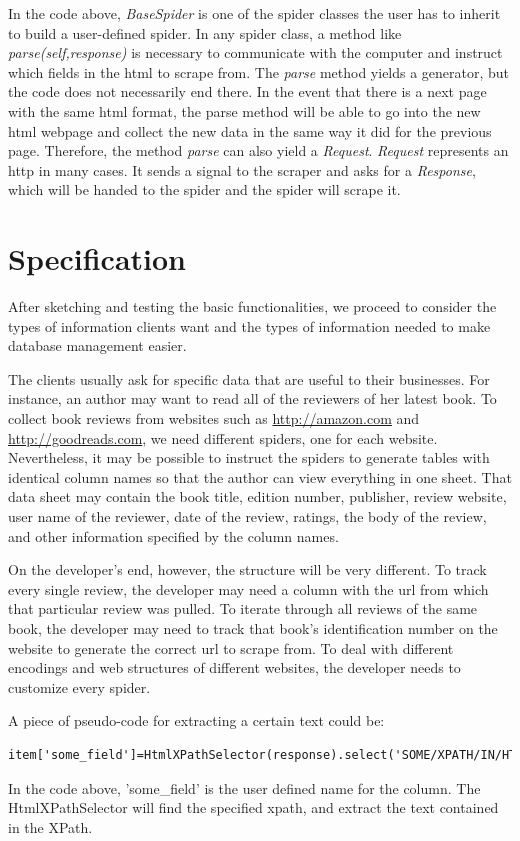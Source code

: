\documentclass[12pt,twoside,draft]{report}
\begin{document}
In the code above, \textit{BaseSpider} is one of the spider classes the user has to inherit to build a user-defined spider. In any spider class, a method like \textit{parse(self,response)} is necessary to communicate with the computer and instruct which fields in the html to scrape from. The \textit{parse} method yields a generator, but the code does not necessarily end there. In the event that there is a next page with the same html format, the parse method will be able to go into the new html webpage and collect the new data in the same way it did for the previous page. Therefore, the method \textit{parse} can also yield a \textit{Request}. \textit{Request} represents an \gls{http} in many cases. It sends a signal to the scraper and asks for a \textit{Response}, which will be handed to the spider and the spider will scrape it.

\section{Specification}

After sketching and testing the basic functionalities, we proceed to consider the types of information clients want and the types of information needed to make database management easier. 

The clients usually ask for specific data that are useful to their businesses. For instance, an author may want to read all of the reviewers of her latest book. To collect book reviews from websites such as \url{http://amazon.com} and \url{http://goodreads.com}, we need different spiders, one for each website. Nevertheless, it may be possible to instruct the spiders to generate tables with identical column names so that the author can view everything in one sheet. That data sheet may contain the book title, edition number, publisher, review website, user name of the reviewer, date of the review, ratings, the body of the review, and other information specified by the column names.

On the developer's end, however, the structure will be very different. To track every single review, the developer may need a column with the url from which that particular review was pulled. To iterate through all reviews of the same book, the developer may need to track that book's identification number on the website to generate the correct url to scrape from. To deal with different encodings and web structures of different websites, the developer needs to customize every spider.

A piece of pseudo-code for extracting a certain text could be:
\begin{lstlisting}
item['some_field']=HtmlXPathSelector(response).select('SOME/XPATH/IN/HTML/text()').extract()
\end{lstlisting}
In the code above, 'some\_field' is the user defined name for the column. The HtmlXPathSelector will find the specified \gls{xpath}, and extract the text contained in the XPath.
\end{document}
